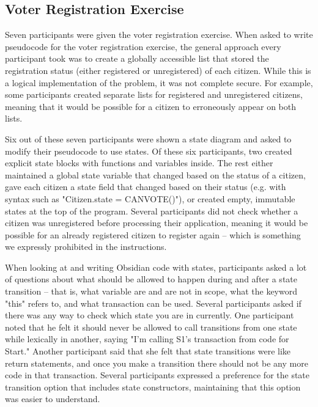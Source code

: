 \documentclass[sigplan,10pt,review]{acmart}\settopmatter{printfolios=true}
\begin{document}
\subsection{Voter Registration Exercise}

Seven participants were given the voter registration exercise. When asked to write pseudocode for the voter registration exercise, the 
general approach every participant took was to create a globally accessible list that stored the registration status (either registered or 
unregistered) of each citizen. While this is a logical implementation of the problem, it was not complete secure. For example, some 
participants created separate lists for registered and unregistered citizens, meaning that it would be possible for a citizen to erroneously 
appear on both lists. 
 	
Six out of these seven participants were shown a state diagram and asked to modify their pseudocode to use states. Of these six 
participants, two created explicit state blocks with functions and variables inside. The rest either maintained a global state variable that 
changed based on the status of a citizen, gave each citizen a state field that changed based on their status (e.g. with syntax such as 
"Citizen.state = CANVOTE()"), or created empty, immutable states at the top of the program. Several participants did not check whether a 
citizen was unregistered before processing their application, meaning it would be possible for an already registered citizen to register again 
-- which is something we expressly prohibited in the instructions. 
	
When looking at and writing Obsidian code with states, participants asked a lot of questions about what should be allowed to happen 
during and after a state transition -- that is, what variable are and are not in scope, what the keyword "this" refers to, and what transaction 
can be used. Several participants asked if there was any way to check which state you are in currently. One participant noted that he felt it 
should never be allowed to call transitions from one state while lexically in another, saying "I'm calling S1's transaction from code for Start."
Another participant said that she felt that state transitions were like return statements, and once you make a transition there should not be 
any more code in that transaction. Several participants expressed a preference for the state transition option that includes state 
constructors, maintaining that this option was easier to understand. 
\end{document}
